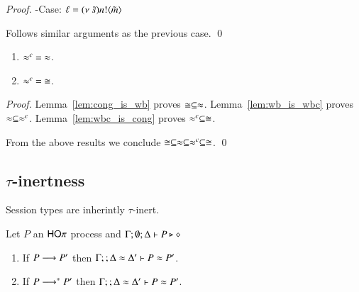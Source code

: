 \begin{proof}
	\noi -Case: $\ell = (\nu\ \tilde{s}) n ! \langle \tilde{m} \rangle$

	\noi Follows similar arguments as the previous case.
	\qed
\end{proof}


\begin{theorem}[Concidence]
	\begin{enumerate}
		\item	$\approx^{c}\ =\ \approx$.
		\item	$\approx^{c}\ =\ \cong$.
	\end{enumerate}
\end{theorem}

\begin{proof}
	\noi	Lemma~\ref{lem:cong_is_wb} proves $\cong \subseteq \approx$.
		Lemma~\ref{lem:wb_is_wbc} proves $\approx \subseteq \approx^{c}$.
		Lemma~\ref{lem:wbc_is_cong} proves $\approx^{c} \subseteq \cong$.

	\noi From the above results we conclude $\cong \subseteq \approx \subseteq \approx^{c} \subseteq \cong$. 
	\qed
\end{proof}


\subsection{$\tau$-inertness}
\label{app:sub_tau_inert}

Session types are inherintly $\tau$-inert.

\begin{lemma}\rm
	\label{lem:tau_inert}
	Let $P$ an $\mathsf{HO}\pi$ process
	and $\Gamma; \emptyset; \Delta \vdash P \triangleright \diamond$
	\begin{enumerate}
		\item	If $P \longrightarrow P'$ then $\Gamma; \empty; \Delta \wb \Delta' \proves P \wb P'$.
		\item	If $P \longrightarrow^* P'$ then $\Gamma; \empty; \Delta \wb \Delta' \proves P \wb P'$.
	\end{enumerate}
\end{lemma}

